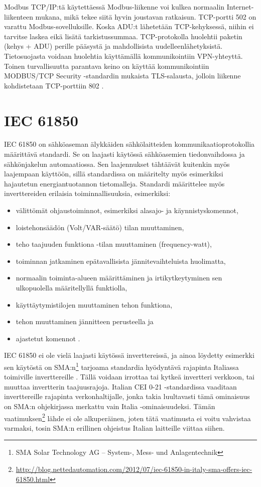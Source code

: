    Modbus TCP/IP:tä käytettäessä Modbus-liikenne voi kulkea normaalin Internet-liikenteen mukana, mikä tekee siitä hyvin joustavan ratkaisun. TCP-portti 502 on varattu Modbus-sovelluksille. \parencite{modbusTCPIPSpec} Koska ADU:t lähetetään TCP-kehyksessä, niihin ei tarvitse laskea eikä lisätä tarkistussummaa. TCP-protokolla huolehtii paketin (kehys + ADU) perille pääsystä ja mahdollisista uudelleenlähetyksistä. Tietosuojasta voidaan huolehtia käyttämällä kommunikointiin \gls{VPN}-yhteyttä. Toinen turvallisuutta parantava keino on käyttää kommunikointiin MODBUS/TCP Security -standardin mukaista TLS-salausta, jolloin liikenne kohdistetaan TCP-porttiin 802 \parencite{modbusTCPIPTLSSpec}.

\section{IEC 61850}
  \gls{IEC} 61850 on sähköaseman älykkäiden sähkölaitteiden kommunikaatioprotokollia määrittävä standardi. Se on laajasti käytössä sähköasemien tiedonvaihdossa ja sähkönjakelun automaatiossa. Sen laajennukset tähtäävät kuitenkin myös laajempaan käyttöön, sillä standardissa on määritelty myös esimerkiksi hajautetun energiantuotannon tietomalleja. Standardi määrittelee myös inverttereiden erilaisia toiminnallisuuksia, esimerkiksi:
    \begin{itemize}
      \item välittömät ohjaustoiminnot, esimerkiksi alasajo- ja käynnistyskomennot,
      \item loistehonsäädön (Volt/VAR-säätö) tilan muuttaminen,
      \item teho taajuuden funktiona -tilan muuttaminen (frequency-watt),
      \item toiminnan jatkaminen epätavallisista jännitevaihteluista huolimatta,
      \item normaalin toiminta-alueen määrittäminen ja irtikytkeytyminen sen ulkopuolella määritellyllä funktiolla,
      \item käyttäytymistilojen muuttaminen tehon funktiona,
      \item tehon muuttaminen jännitteen perusteella ja
      \item ajastetut komennot \parencite{61850funcs}.
    \end{itemize}

  IEC 61850 ei ole vielä laajasti käytössä inverttereissä, ja ainoa löydetty esimerkki sen käytöstä on SMA:n\footnote{SMA Solar Technology AG -- System-, Mess- und Anlagentechnik} tarjoama standardia hyödyntävä rajapinta Italiassa toimiville inverttereille \parencite{SMAManual}. Tällä voidaan irrottaa tai kytkeä invertteri verkkoon, tai muuttaa invertterin taajuusrajoja. Italian CEI 0-21 -standardissa vaaditaan inverttereille rajapinta verkonhaltijalle, jonka takia luultavasti tämä ominaisuus on SMA:n ohjekirjassa merkattu vain Italia -ominaisuudeksi. Tämän vaatimuksen\footnote{\url{http://blog.nettedautomation.com/2012/07/iec-61850-in-italy-sma-offers-iec-61850.html}} lähde ei ole alkuperäinen, joten tätä vaatimusta ei voitu vahvistaa varmaksi, tosin SMA:n erillinen ohjeistus Italian laitteille viittaa siihen.


